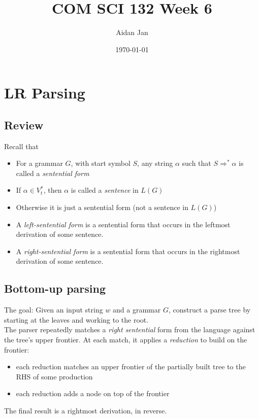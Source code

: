 \documentclass[10pt]{article}
\title{COM SCI 132 Week 6}
\author{Aidan Jan}
\date{\today}
\begin{document}
\maketitle

\section*{LR Parsing}
\subsection*{Review}
Recall that
\begin{itemize}
    \item For a grammar $G$, with start symbol $S$, any string $\alpha$ such that $S \Rightarrow^* \alpha$ is called a \textit{sentential form}
    \item If $\alpha \in V_t^*$, then $\alpha$ is called a \textit{sentence} in $L(G)$
    \item Otherwise it is just a sentential form (not a sentence in $L(G)$)
    \item A \textit{left-sentential form} is a sentential form that occurs in the leftmost derivation of some sentence.
    \item A \textit{right-sentential form} is a sentential form that occurs in the rightmost derivation of some sentence.
\end{itemize}

\subsection*{Bottom-up parsing}
The goal: Given an input string $w$ and a grammar $G$, construct a parse tree by starting at the leaves and working to the root.\\
The parser repeatedly matches a \textit{right sentential} form from the language against the tree's upper frontier.  At each match, it applies a \textit{reduction} to build on the frontier:
\begin{itemize}
    \item each reduction matches an upper frontier of the partially built tree to the RHS of some production
    \item each reduction adds a node on top of the frontier
\end{itemize}
The final result is a rightmost derivation, in reverse.
\end{document}
